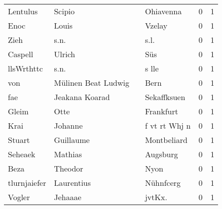 \begin{tabular}{llllrr}
                 Lentulus &                             Scipio &             &                                   Ohiavenna &          0 &         1 \\
                     Enoc &                              Louis &             &                                      Vzelay &          0 &         1 \\
                     Zieh &                               s.n. &             &                                        s.l. &          0 &         1 \\
                  Caspell &                             Ulrich &             &                                         Süs &          0 &         1 \\
               llsWrthttc &                               s.n. &             &                                       s lle &          0 &         1 \\
                      von &                Mülinen Beat Ludwig &             &                                        Bern &          0 &         1 \\
                      fae &                     Jeakana Koarad &             &                                 Sekaffksuen &          0 &         1 \\
                    Gleim &                               Otte &             &                                   Frankfurt &          0 &         1 \\
                     Krai &                            Johanne &             &                               f vt rt Whj n &          0 &         1 \\
                   Stuart &                          Guillaume &             &                                 Montbeliard &          0 &         1 \\
                  Seheaek &                            Mathias &             &                                    Augsburg &          0 &         1 \\
                     Beza &                            Theodor &             &                                        Nyon &          0 &         1 \\
             tlurnjaiefer &                         Laurentius &             &                                   Nühnfcerg &          0 &         1 \\
                   Vogler &                            Jehaaae &             &                                     jvtKx.  &          0 &         1 \\

\end{tabular}
